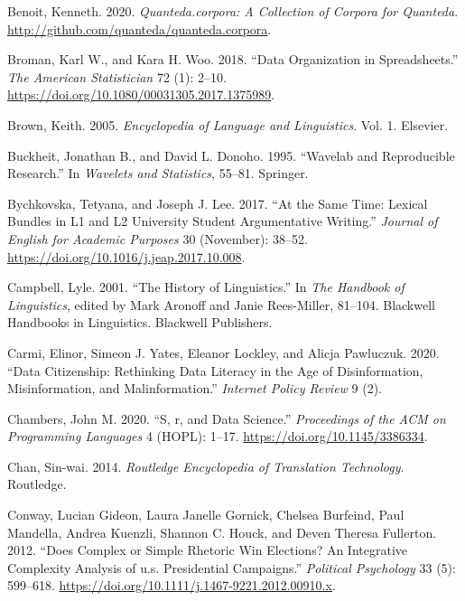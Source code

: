 \documentclass[
  letterpaper,
]{latex/krantz}
\newlength{\cslhangindent}
\newlength{\cslentryspacingunit} %
\newenvironment{CSLReferences}[2] %
 {%
  \setlength{\parindent}{0pt}
  \ifodd #1
  \let\oldpar\par
  \def\par{\hangindent=\cslhangindent\oldpar}
  \fi
  \setlength{\parskip}{#2\cslentryspacingunit}
 }%
 {}
\begin{document}
\begin{CSLReferences}{1}{0}
\leavevmode{}%
Benoit, Kenneth. 2020. \emph{Quanteda.corpora: A Collection of Corpora
for Quanteda}. \url{http://github.com/quanteda/quanteda.corpora}.

\leavevmode{}%
Broman, Karl W., and Kara H. Woo. 2018. {``Data Organization in
Spreadsheets.''} \emph{The American Statistician} 72 (1): 2--10.
\url{https://doi.org/10.1080/00031305.2017.1375989}.

\leavevmode{}%
Brown, Keith. 2005. \emph{Encyclopedia of Language and Linguistics}.
Vol. 1. Elsevier.

\leavevmode{}%
Buckheit, Jonathan B., and David L. Donoho. 1995. {``Wavelab and
Reproducible Research.''} In \emph{Wavelets and Statistics}, 55--81.
Springer.

\leavevmode{}%
Bychkovska, Tetyana, and Joseph J. Lee. 2017. {``At the Same Time:
Lexical Bundles in L1 and L2 University Student Argumentative
Writing.''} \emph{Journal of English for Academic Purposes} 30
(November): 38--52. \url{https://doi.org/10.1016/j.jeap.2017.10.008}.

\leavevmode{}%
Campbell, Lyle. 2001. {``The History of Linguistics.''} In \emph{The
Handbook of Linguistics}, edited by Mark Aronoff and Janie Rees-Miller,
81--104. Blackwell Handbooks in Linguistics. Blackwell Publishers.

\leavevmode{}%
Carmi, Elinor, Simeon J. Yates, Eleanor Lockley, and Alicja Pawluczuk.
2020. {``Data Citizenship: Rethinking Data Literacy in the Age of
Disinformation, Misinformation, and Malinformation.''} \emph{Internet
Policy Review} 9 (2).

\leavevmode{}%
Chambers, John M. 2020. {``S, r, and Data Science.''} \emph{Proceedings
of the ACM on Programming Languages} 4 (HOPL): 1--17.
\url{https://doi.org/10.1145/3386334}.

\leavevmode{}%
Chan, Sin-wai. 2014. \emph{Routledge Encyclopedia of Translation
Technology}. Routledge.

\leavevmode{}%
Conway, Lucian Gideon, Laura Janelle Gornick, Chelsea Burfeind, Paul
Mandella, Andrea Kuenzli, Shannon C. Houck, and Deven Theresa Fullerton.
2012. {``Does Complex or Simple Rhetoric Win Elections? An Integrative
Complexity Analysis of u.s. Presidential Campaigns.''} \emph{Political
Psychology} 33 (5): 599--618.
\url{https://doi.org/10.1111/j.1467-9221.2012.00910.x}.


\end{CSLReferences}
\end{document}
